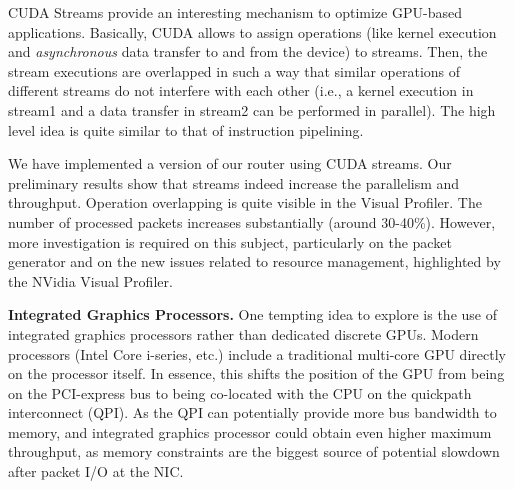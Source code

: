 CUDA Streams provide an interesting mechanism to optimize GPU-based
applications. Basically, CUDA allows to assign operations (like kernel
execution and \emph{asynchronous} data transfer to and from the device) to
streams. Then, the stream executions are overlapped in such a way that similar
operations of different streams do not interfere with each other (i.e., a kernel
execution in stream1 and a data transfer in stream2 can be performed in
parallel). The high level idea is quite similar to that of instruction
pipelining.

We have implemented a version of our router using CUDA streams. Our preliminary
results show that streams indeed increase the parallelism and throughput.
Operation overlapping is quite visible in the Visual Profiler. The number of
processed packets increases substantially (around 30-40\%). However, more
investigation is required on this subject, particularly on the packet generator
and on the new issues related to resource management, highlighted by the NVidia 
Visual Profiler.


\medskip \noindent \textbf{Integrated Graphics Processors.} One tempting idea
to explore is the use of integrated graphics processors rather than dedicated
discrete GPUs. Modern processors (Intel Core i-series, etc.) include a
traditional multi-core GPU directly on the processor itself. In essence, this
shifts the position of the GPU from being on the PCI-express bus to being
co-located with the CPU on the quickpath interconnect (QPI). As the QPI can
potentially provide more bus bandwidth to memory, and integrated graphics
processor could obtain even higher maximum throughput, as memory constraints
are the biggest source of potential slowdown after packet I/O at the NIC.

